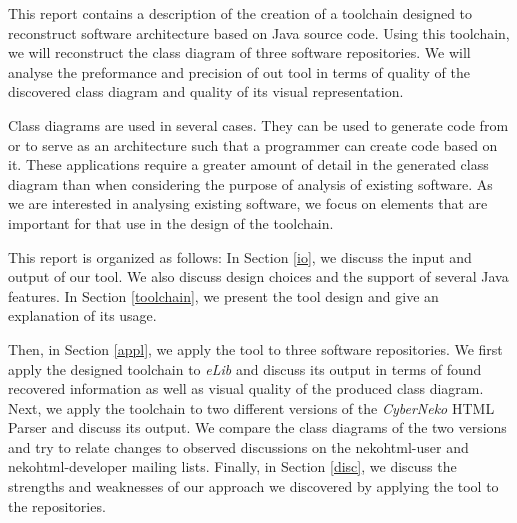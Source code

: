 This report contains a description of the creation of a toolchain designed to reconstruct software architecture based on Java source code.
Using this toolchain, we will reconstruct the class diagram of three software repositories. We will analyse the preformance and precision of out tool in terms of quality of the discovered class diagram and quality of its visual representation.

Class diagrams are used in several cases. 
They can be used to generate code from or to serve as an architecture such that a programmer can create code based on it.
These applications require a greater amount of detail in the generated class diagram than when considering the purpose of analysis of existing software.
As we are interested in analysing existing software, we focus on elements that are important for that use in the design of the toolchain.

This report is organized as follows:
In Section \ref{io}, we discuss the input and output of our tool. We also discuss design choices and the support of several Java features.
In Section \ref{toolchain}, we present the tool design and give an explanation of its usage. 

Then, in Section \ref{appl}, we apply the tool to three software repositories. We first apply the designed toolchain to \textit{eLib} and discuss its output in terms of found recovered information as well as visual quality of the produced class diagram. Next, we apply the toolchain to two different versions of the \textit{CyberNeko} HTML Parser and discuss its output. We compare the class diagrams of the two versions and try to relate changes to observed discussions on the nekohtml-user and nekohtml-developer mailing lists. Finally, in Section \ref{disc}, we discuss the strengths and weaknesses of our approach we discovered by applying the tool to the repositories.


